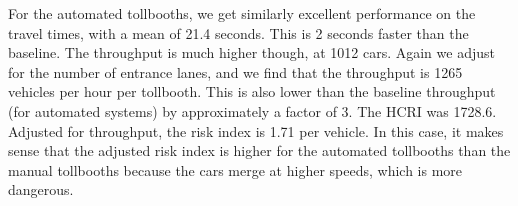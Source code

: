 \documentclass[a4paper, 11pt]{article}
\begin{document}
For the automated tollbooths, we get similarly excellent performance on the travel times, with a mean of 21.4 seconds. This is 2 seconds faster than the baseline. 
The throughput is much higher though, at 1012 cars. Again we adjust for the number of entrance lanes, and we find that the throughput is 1265 vehicles per hour per tollbooth. This is also lower than the baseline throughput (for automated systems) by approximately a factor of 3. The HCRI was 1728.6. Adjusted for throughput, the risk index is 1.71 per vehicle. In this case, it makes sense that the adjusted risk index is higher for the automated tollbooths than the manual tollbooths because the cars merge at higher speeds, which is more dangerous. 








%
%
\end{document}
